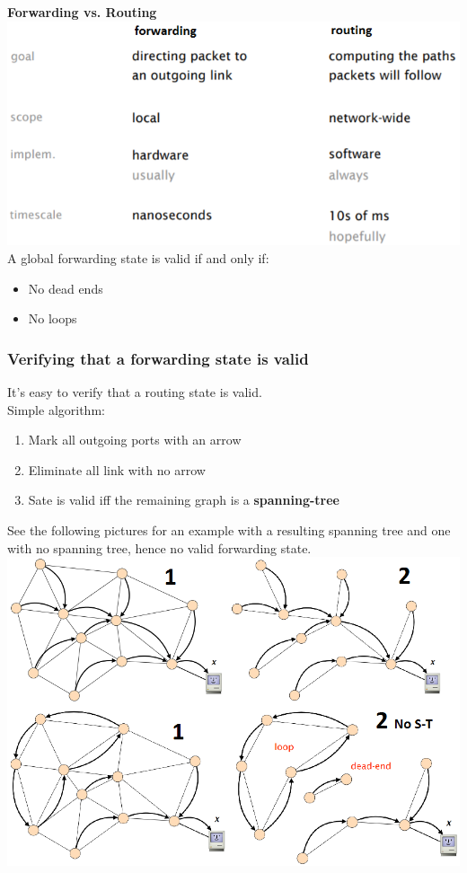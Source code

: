 \documentclass[a4paper, fontsize=8pt, landscape, DIV=1]{scrartcl}
\begin{document}
\begin{multicols*}{4}
\begin{center}
			\end{center}
			\textbf{Forwarding vs. Routing}\\
			\vspace{0.1cm}	
			\includegraphics[width=\columnwidth]{images/Concepts/forwarding_vs_routing.png}
			A global forwarding state is valid if and only if:
			\begin{itemize}[noitemsep]
				\item No dead ends
				\item No loops
			\end{itemize} 
		
			\subsubsection{Verifying that a forwarding state is valid}
			It's easy to verify that a routing state is valid. \\
			Simple algorithm: 
			\vspace{-0.1cm}
			\begin{enumerate}[noitemsep]
				\item Mark all outgoing ports with an arrow
				\item Eliminate all link with no arrow 
				\item Sate is valid iff the remaining graph is a \textbf{spanning-tree}
			\end{enumerate} 
			See the following pictures for an example with a resulting spanning tree and one with no spanning tree, hence no valid forwarding state.
			\includegraphics[width=\columnwidth]{images/Concepts/check_s_t.png}
			 

\end{multicols*}
\end{document}
